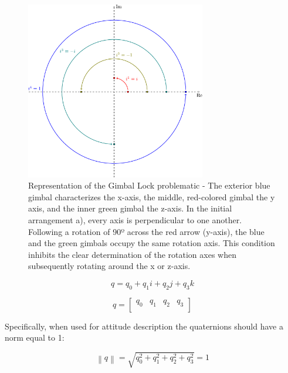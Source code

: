 \begin{figure}[!h]
    \centering
    \includegraphics[width=0.7\textwidth]{figures/complex_rotation.pdf}
    \caption{Representation of the Gimbal Lock problematic \cite{zeitlhofler2019nominal} - The exterior blue gimbal characterizes the x-axis, the middle, red-colored gimbal the y axis, and the inner green gimbal the z-axis. In the initial arrangement a), every axis is perpendicular to one another. Following a rotation of 90º across the red arrow (y-axis), the blue and the green gimbals occupy the same rotation axis. This condition inhibits the clear determination of the rotation axes when subsequently rotating around the x or z-axis. }
    \label{fig:complex_rotation}
\end{figure}

\begin{equation}
    q = q_0 + q_1 i + q_2 j + q_3 k
    \label{eq:quaternion_representation}
\end{equation}

\begin{equation}
    q =     \begin{bmatrix}
        q_0 & q_1 & q_2 & q_3 \\
    \end{bmatrix}
    \label{eq:quaternion_vector}
\end{equation}

Specifically, when used for attitude description the quaternions should have a norm equal to 1:

\begin{equation}
    \left\lVert q\right\rVert =\sqrt{q^2_0 + q^2_1 + q^2_2 + q^2_3} =1
\end{equation}

